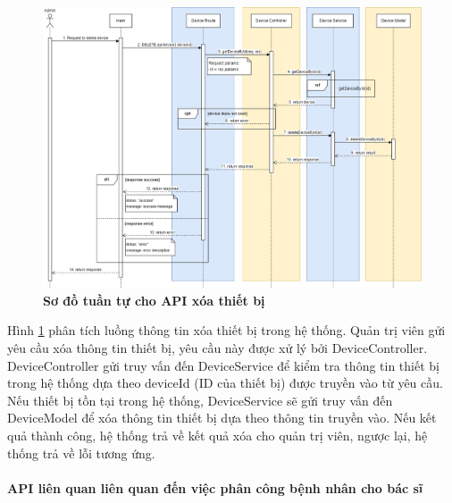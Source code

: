  \begin{figure}[H]
  \centering
  \includegraphics[scale=0.4]{Images/sequence_api/deleteDeviceById.png}
  \caption[Sơ đồ tuần tự cho API xóa thiết bị]{\bfseries \fontsize{12pt}{0pt}
  \selectfont Sơ đồ tuần tự cho API xóa thiết bị }
  \label{api_deleteDeviceById} %
\end{figure}
Hình \ref{api_deleteDeviceById} phân tích luồng thông tin xóa thiết bị trong hệ thống. Quản trị viên gửi yêu cầu xóa thông tin thiết bị, 
yêu cầu này được xử lý bởi DeviceController. DeviceController gửi truy vấn đến DeviceService để kiểm tra thông tin thiết bị trong hệ thống dựa theo deviceId (ID của thiết bị) được truyền vào từ yêu cầu. 
Nếu thiết bị tồn tại trong hệ thống, DeviceService sẽ gửi truy vấn đến DeviceModel để xóa thông tin thiết bị 
dựa theo thông tin truyền vào. Nếu kết quả thành công, hệ thống trả về kết quả xóa cho quản trị viên, ngược lại, hệ thống trả về lỗi tương ứng.



\paragraph{API liên quan liên quan đến việc phân công bệnh nhân cho bác sĩ}
\mbox{}


